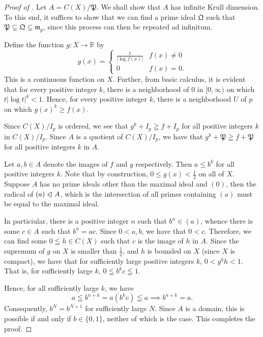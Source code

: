 \documentclass[12pt]{article}
\theoremstyle{thmstyle}
\theoremstyle{defstyle}
\newcommand{\R}{\mathbb{R}}
\newcommand{\frakm}{\mathfrak{m}} %
\newcommand{\frakP}{\mathfrak{P}} %
\newcommand{\frakQ}{\mathfrak{Q}} %
\renewcommand{\le}{\leqslant}
\renewcommand{\ge}{\geqslant}
\newcommand{\noreq}{\trianglelefteqslant}
\begin{document}
\begin{proof}[Proof of ]
Let $A = C(X)/\frakP$. We shall show that $A$ has infinite Krull dimension. To this end, it suffices to show that we can find a prime ideal $\frakQ$ such that $\frakP\subsetneq\frakQ\subsetneq\frakm_p$, since this process can then be repeated ad infinitum.

Define the function $g: X\to\R$ by 
\begin{equation*}
    g(x) = 
    \begin{cases}
        \frac{1}{|\log f(x)|} & f(x)\ne 0\\
        0 & f(x) = 0.
    \end{cases}
\end{equation*}
This is a continuous function on $X$. Further, from basic calculus, it is evident that for every positive integer $k$, there is a neighborhood of $0$ in $[0,\infty)$ on which $t|\log t|^k < 1$. Hence, for every positive integer $k$, there is a neighborhood $U$ of $p$ on which $g(x)^k\ge f(x)$.

Since $C(X)/I_p$ is ordered, we see that $g^k + I_p\geqq f + I_p$ for all positive integers $k$ in $C(X)/I_p$. Since $A$ is a quotient of $C(X)/I_p$, we have that $g^k + \frakP\geqq f + \frakP$ for all positive integers $k$ in $A$. 

Let $a,b\in A$ denote the images of $f$ and $g$ respectively. Then $a\le b^k$ for all positive integers $k$. Note that by construction, $0\le g(x) < \frac{1}{2}$ on all of $X$. Suppose $A$ has no prime ideals other than the maximal ideal and $(0)$, then the radical of $(a)\noreq A$, which is the intersection of all primes containing $(a)$ must be equal to the maximal ideal.

In particiular, there is a positive integer $n$ such that $b^n\in (a)$, whence there is some $c\in A$ such that $b^n = ac$. Since $0 < a, b$, we have that $0 < c$. Therefore, we can find some $0\leqq h\in C(X)$ such that $c$ is the image of $h$ in $A$. Since the supremum of $g$ on $X$ is smaller than $\frac{1}{2}$, and $h$ is bounded on $X$ (since $X$ is compact), we have that for sufficiently large positive integers $k$, $0 < g^kh < 1$. That is, for sufficiently large $k$, $0\leqq b^kc\leqq 1$. 

Hence, for all sufficiently large $k$, we have 
\begin{equation*}
    a\leqq b^{n + k} = a(b^kc)\leqq a\implies b^{n + k} = a.
\end{equation*}
Consequently, $b^N = b^{N + 1}$ for sufficiently large $N$. Since $A$ is a domain, this is possible if and only if $b\in\{0, 1\}$, neither of which is the case. This completes the proof.
\end{proof}
\end{document}
